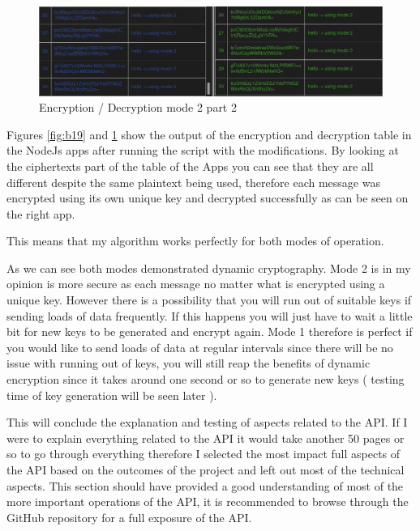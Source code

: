 \begin{figure}[!h]
  \centering
      \includegraphics[width=1\textwidth]{Figures/b20.png}
  \caption[Encryption / Decryption mode 2 part 2]{Encryption / Decryption mode 2 part 2}
  \label{fig:b20}
\end{figure}
\FloatBarrier
Figures \ref{fig:b19} and \ref{fig:b20} show the output of the encryption and decryption table in the NodeJs apps after running the script with the modifications.
By looking at the ciphertexts part of the table of the Apps you can see that they are all different despite the same plaintext being used, therefore each message was encrypted using its own unique key and decrypted successfully as can be seen on the right app. 

This means that my algorithm works perfectly for both modes of operation.

As we can see both modes demonstrated dynamic cryptography. Mode 2 is in my opinion is more secure as each message no matter what is encrypted using a unique key. However there is a possibility that you will run out of suitable keys if sending loads of data frequently. If this happens you will just have to wait a little bit for new keys to be generated and encrypt again. 
Mode 1 therefore is perfect if you would like to send loads of data at regular intervals since there will be no issue with running out of keys, you will still reap the benefits of dynamic encryption since it takes around one second or so to generate new keys ( testing time of key generation will be seen later ). 

This will conclude the explanation and testing of aspects related to the API. If I were to explain everything related to the API it would take another 50 pages or so to go through everything therefore I selected the most impact full aspects of the API based on the outcomes of the project and left out most of the technical aspects. This section should have provided a good understanding of most of the more important operations of the API, it is recommended to browse through the GitHub repository for a full exposure of the API. 